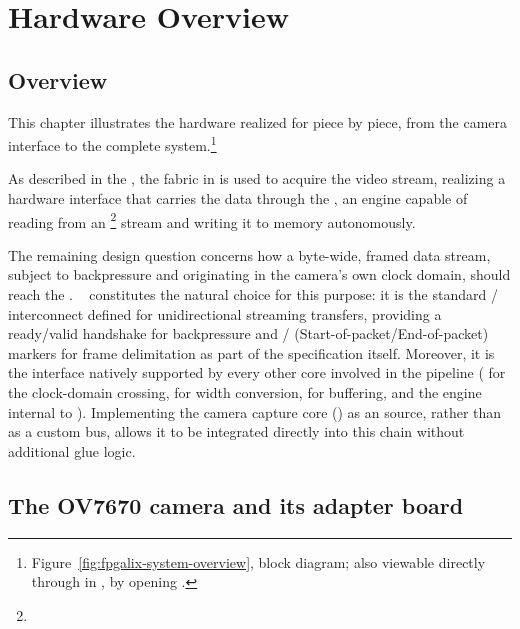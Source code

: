 \chapter{Hardware Overview}
\label{chap:fpgalix-hw-overview}

\section{Overview}
\label{sec:fpgalix-overview}

This chapter illustrates the hardware realized for  piece by piece, from the  camera interface to the complete system.\footnote{Figure~\ref{fig:fpgalix-system-overview},  block diagram; also viewable directly through  in , by opening .}

As described in the , the  fabric in  is used to acquire the video stream, realizing a hardware interface that carries the data through the   \cite{EP-IPUG}, an   engine capable of reading from an \footnote{} stream and writing it to memory autonomously.

The remaining design question concerns how a byte-wide, framed data stream, subject to backpressure and originating in the camera's own clock domain, should reach the . ~\cite{AVALON-SPEC} constitutes the natural choice for this purpose: it is the standard / interconnect defined for unidirectional streaming transfers, providing a ready/valid handshake for backpressure and / (Start-of-packet/End-of-packet) markers for frame delimitation as part of the specification itself. Moreover, it is the interface natively supported by every other  core involved in the pipeline ( for the clock-domain crossing,  for width conversion,  for buffering, and the  engine internal to ). Implementing the camera capture core () as an  source, rather than as a custom bus, allows it to be integrated directly into this chain without additional glue logic.

\section{The OV7670 camera and its adapter board}

